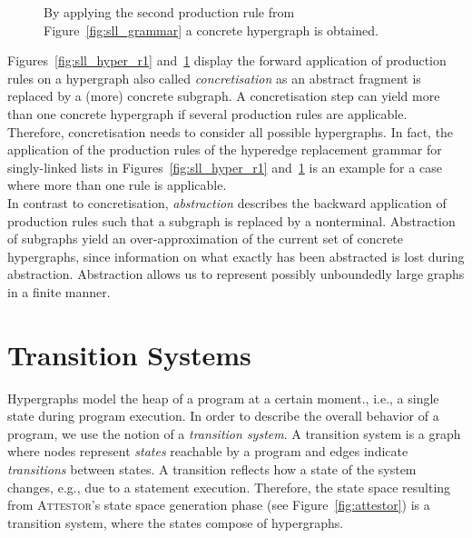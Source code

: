 \documentclass[a4paper, 12pt, twoside]{report}
\begin{document}
\begin{figure}
\begin{center}
{}
			\caption{By applying the second production rule from Figure~\ref{fig:sll_grammar} a concrete hypergraph is obtained.}\label{fig:sll_hyper_r2}
		\end{center}
	\end{figure}	
	
	Figures~\ref{fig:sll_hyper_r1} and~\ref{fig:sll_hyper_r2} display the forward application of production rules on a hypergraph also called \textit{concretisation} as an abstract fragment is replaced by a (more) concrete subgraph. A concretisation step can yield more than one concrete hypergraph if several production rules are applicable. Therefore, concretisation needs to consider all possible hypergraphs. In fact, the application of the production rules of the hyperedge replacement grammar for singly-linked lists in Figures~\ref{fig:sll_hyper_r1} and~\ref{fig:sll_hyper_r2} is an example for a case where more than one rule is applicable. \\
	
	In contrast to concretisation, \textit{abstraction} describes the backward application of production rules such that a subgraph is replaced by a nonterminal. Abstraction of subgraphs yield an over-approximation of the current set of concrete hypergraphs, since information on what exactly has been abstracted is lost during abstraction. Abstraction allows us to represent possibly unboundedly large graphs in a finite manner.\\
	
	\section{Transition Systems}\label{sec:transition_system}
	
	Hypergraphs model the heap of a program at a certain moment., i.e., a single state during program execution. In order to describe the overall behavior of a program, we use the notion of a \textit{transition system}. A transition system is a graph where nodes represent \textit{states} reachable by a program and edges indicate \textit{transitions} between states. A transition reflects how a state of the system changes, e.g., due to a statement execution. Therefore, the state space resulting from \textsc{Attestor}'s state space generation phase (see Figure~\ref{fig:attestor}) is a transition system, where the states compose of hypergraphs.
	
\end{document}
